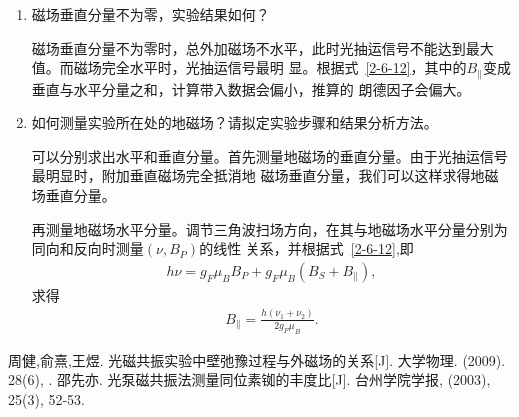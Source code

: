\documentclass[11pt,a4paper]{article}
\begin{document}
\begin{spacing}{1.3}
\begin{CJK*}{UTF8}{gbsn}
\begin{enumerate}
\item  磁场垂直分量不为零，实验结果如何？\par 
磁场垂直分量不为零时，总外加磁场不水平，此时光抽运信号不能达到最大值。而磁场完全水平时，光抽运信号最明
显。根据式~\eqref{2-6-12}，其中的$B_{\parallel}$变成垂直与水平分量之和，计算带入数据会偏小，推算的
朗德因子会偏大。
\item  如何测量实验所在处的地磁场？请拟定实验步骤和结果分析方法。\par
可以分别求出水平和垂直分量。首先测量地磁场的垂直分量。由于光抽运信号最明显时，附加垂直磁场完全抵消地
磁场垂直分量，我们可以这样求得地磁场垂直分量。\par 
再测量地磁场水平分量。调节三角波扫场方向，在其与地磁场水平分量分别为同向和反向时测量$(\nu,B_P)$的线性
关系，并根据式~\eqref{2-6-12},即
\begin{eqnarray} 
h\nu=g_F\mu_BB_P+g_F\mu_B(B_S+B_{\parallel}),
\end{eqnarray}
求得
\begin{eqnarray} 
B_{\parallel}=\frac{h(\nu_1+\nu_2)}{2 g_F\mu_B}.
\end{eqnarray}
\end{enumerate}




\medskip
\renewcommand{\refname}{参考文献}
\begin{thebibliography}{99}
周健,俞熹,王煜. 光磁共振实验中壁弛豫过程与外磁场的关系[J]. 大学物理. (2009). 28(6), .
邵先亦. 光泵磁共振法测量同位素铷的丰度比[J]. 台州学院学报, (2003), 25(3), 52-53.
\end{thebibliography}
\end{CJK*}
%
\end{spacing}
\end{document}
